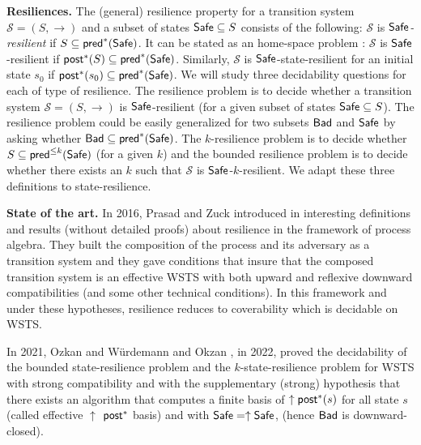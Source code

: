 {\bf Resiliences.}  
The (general) resilience property for a transition system $\mathscr{S} = (S,\rightarrow )$ and a subset of states $\textsf{Safe} \subseteq S$ consists of the following: $\mathscr{S}$ is {\em $\textsf{Safe}$-resilient} if
$S \subseteq \textsf{pred}^*(\textsf{Safe})$. %
It 
can be stated as an home-space problem : $\mathscr{S}$ is $\textsf{Safe}$-resilient if $\textsf{post}^*(S) \subseteq \textsf{pred}^*(\textsf{Safe})$.
Similarly, $\mathscr{S}$ is $\textsf{Safe}$-state-resilient for an initial state $s_0$ if  
$\textsf{post}^*(s_0) \subseteq \textsf{pred}^*(\textsf{Safe})$.
We will study three decidability questions for each of type of resilience.
The resilience problem is to decide whether a transition system $\mathscr{S} = (S,\rightarrow )$ is $\textsf{Safe}$-resilient (for a given subset of states $\textsf{Safe} \subseteq S$).
The resilience problem could be easily generalized for two subsets $\textsf{Bad}$ and $\textsf{Safe}$ by asking
whether $\textsf{Bad} \subseteq \textsf{pred}^*(\textsf{Safe})$.
The $k$-resilience problem is to decide whether $S \subseteq \textsf{pred}^{\leq k}(\textsf{Safe})$ (for a given $k$) and 
the bounded resilience problem is to decide whether there exists an $k$ such that $\mathscr{S}$ is $\textsf{Safe}$-$k$-resilient. We adapt these three definitions to state-resilience.


{\bf State of the art.}
In 2016, Prasad and Zuck introduced in  \cite{DBLP:journals/corr/PrasadZ16} interesting definitions and results (without detailed proofs) about resilience in the framework of process algebra. They built the composition of the process and its adversary as a transition system and they gave conditions that insure that the composed transition system is an effective WSTS with both upward and reflexive downward compatibilities (and some other technical conditions). In this framework and under these hypotheses, resilience reduces to coverability which is decidable on WSTS. 

In 2021, Ozkan and Würdemann  \cite{DBLP:journals/corr/abs-2108-00889} and Okzan \cite{DBLP:conf/gg/Ozkan22}, in 2022, proved the decidability of the bounded state-resilience problem and the $k$-state-resilience problem for WSTS  with strong compatibility and with the supplementary (strong) hypothesis that there exists an algorithm that computes a finite basis of $\uparrow \textsf{post}^*(s)$ for all state $s$ (called effective 
$\uparrow$ $\textsf{post}^*$ basis) and with $\textsf{Safe}=\uparrow \textsf{Safe}$, (hence $\textsf{Bad}$ is downward-closed).

